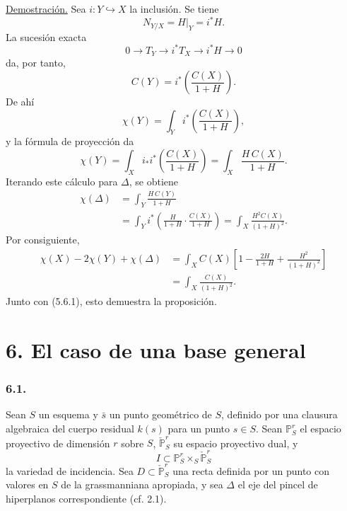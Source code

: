 \pageoriginale

\noindent\underline{Demostración.}
Sea $i:Y\hookrightarrow X$ la inclusión. Se tiene
\[
N_{Y/X}=H|_Y=i^*H.
\]
La sucesión exacta
\[
0\longrightarrow T_Y
\longrightarrow i^*T_X
\longrightarrow i^*H
\longrightarrow0
\]
da, por tanto,
\begin{equation}\tag{5.7.4}
C(Y)=i^*\!\left(\frac{C(X)}{1+H}\right).
\end{equation}
De ahí
\[
\chi(Y)=\int_Yi^*\!\left(\frac{C(X)}{1+H}\right),
\]
y la fórmula de proyección da
\begin{equation}\tag{5.7.5}
\chi(Y)
=\int_Xi_*i^*\!\left(\frac{C(X)}{1+H}\right)
=\int_X\frac{H\,C(X)}{1+H}.
\end{equation}
Iterando este cálculo para $\Delta$, se obtiene
\begin{equation}\tag{5.7.6}
\begin{aligned}
\chi(\Delta)
&=\int_Y\frac{H\,C(Y)}{1+H}\\
&=\int_Yi^*\!\left(
  \frac{H}{1+H}\cdot\frac{C(X)}{1+H}
  \right)
=\int_X\frac{H^2C(X)}{(1+H)^2}.
\end{aligned}
\end{equation}
Por consiguiente,
\[
\begin{aligned}
\chi(X)-2\chi(Y)+\chi(\Delta)
&=\int_XC(X)\left[
1-\frac{2H}{1+H}+\frac{H^2}{(1+H)^2}
\right]\\
&=\int_X\frac{C(X)}{(1+H)^2}.
\end{aligned}
\]
Junto con (5.6.1), esto demuestra la proposición.

\pageoriginale

\section*{6. El caso de una base general}

\subsubsection*{6.1.}
Sean $S$ un esquema y $\bar s$ un punto geométrico de $S$, definido
por una clausura algebraica del cuerpo residual $k(s)$ para un punto
$s\in S$. Sean $\mathbb P^r_S$ el espacio proyectivo de dimensión
$r$ sobre $S$, $\check{\mathbb P}^{r}_S$ su espacio proyectivo dual,
y
\[
I\subset\mathbb P^r_S\times_S\check{\mathbb P}^{r}_S
\]
la variedad de incidencia. Sea
$D\subset\check{\mathbb P}^{r}_S$ una recta definida por un punto con
valores en $S$ de la grassmanniana apropiada, y sea $\Delta$ el eje
del pincel de hiperplanos correspondiente (cf. 2.1).

